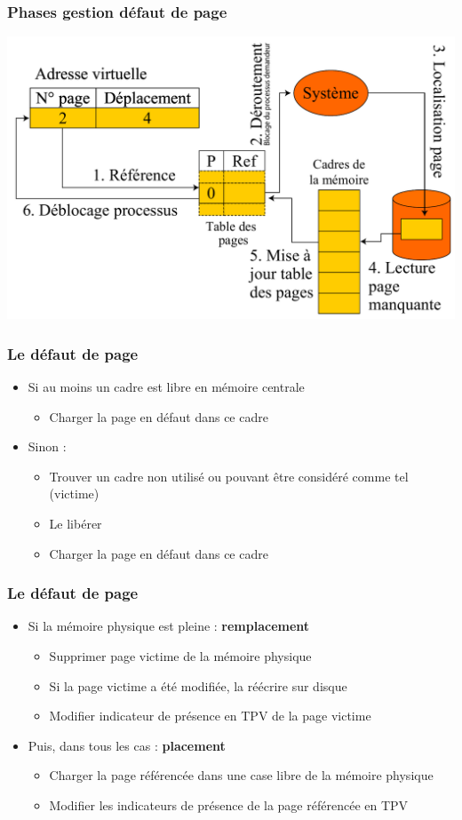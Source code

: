 \begin{frame}
\frametitle{Phases gestion défaut de page}
\includegraphics[width=\textwidth]{../illustration/traitement_defaut_page.pdf}
\end{frame}


\begin{frame}
\frametitle{Le défaut de page}
\begin{itemize}
\item Si au moins un cadre est libre en mémoire centrale
\begin{itemize}
\item Charger la page en défaut dans ce cadre
\end{itemize}
\item Sinon :
\begin{itemize}
\item Trouver un cadre non utilisé ou pouvant être considéré comme tel (victime)
\item Le libérer
\item Charger la page en défaut dans ce cadre
\end{itemize}
\end{itemize}

\end{frame}


\begin{frame}
\frametitle{Le défaut de page}
\begin{itemize}
\item Si la mémoire physique est pleine : \textbf{remplacement}
\begin{itemize}
\item Supprimer page victime de la mémoire physique
\item Si la page victime a été modifiée, la réécrire sur disque
\item Modifier indicateur de présence en TPV de la page victime
\end{itemize}
\item Puis, dans tous les cas : \textbf{placement}
\begin{itemize}
\item Charger la page référencée dans une case libre de la mémoire physique
\item Modifier les indicateurs de présence de la page référencée en TPV
\end{itemize}
\end{itemize}
\end{frame}


